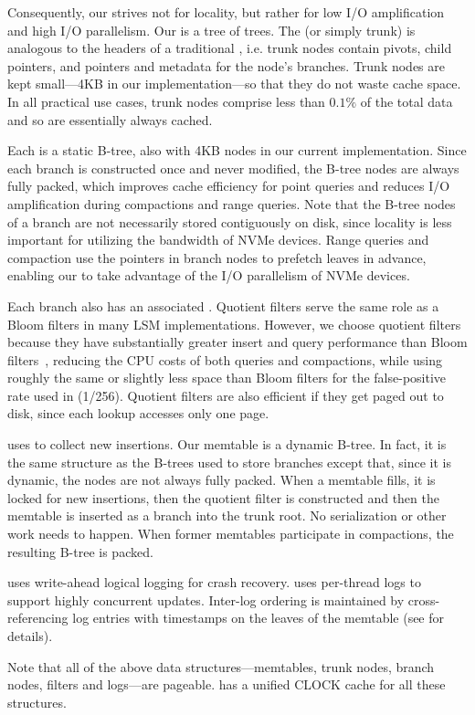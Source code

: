 Consequently, our \datastruct strives not for locality, but rather for
low I/O amplification and high I/O parallelism.  Our \datastruct is a
tree of trees. The  (or simply trunk) is analogous to
the headers of a traditional \bet, i.e. trunk nodes contain pivots,
child pointers, and pointers and metadata for the node's branches.
Trunk nodes are kept small---4KB in our implementation---so that they
do not waste cache space. In all practical use cases, trunk nodes
comprise less than $0.1\%$ of the total data and so are essentially
always cached.

Each  is a static B-tree, also with 4KB nodes in our
current implementation. Since each branch is constructed once and
never modified, the B-tree nodes are always fully packed, which
improves cache efficiency for point queries and reduces I/O
amplification during compactions and range queries.  Note that the
B-tree nodes of a branch are not necessarily stored contiguously on
disk, since locality is less important for utilizing the bandwidth of
NVMe devices. Range queries and compaction use the pointers in branch
nodes to prefetch leaves
in advance, enabling our \datastruct to take advantage of the I/O
parallelism of NVMe devices.

Each branch also has an associated . Quotient
filters serve the same role as a Bloom filters in many LSM
implementations.  However, we choose quotient filters because they
have substantially greater insert and query performance than Bloom
filters~\cite{!thrash:hash:cache:flash:pvldb}, reducing the CPU costs
of both queries and compactions, while using roughly the same or
slightly less space than Bloom filters for the false-positive rate
used in \sysname (1/256).  Quotient filters are also efficient if they
get paged out to disk, since each lookup accesses only one page.

\sysname uses  to collect new insertions.
Our memtable is a dynamic B-tree.  In fact, it is the same structure
as the B-trees used to store branches except that, since it is
dynamic, the nodes are not always fully packed.  When a memtable
fills, it is locked for new insertions, then the quotient filter is
constructed and then the memtable is inserted as a branch into the
trunk root.  No serialization or other work needs to happen.  When
former memtables participate in compactions, the resulting B-tree is
packed.

\sysname uses write-ahead logical logging for crash recovery.
\sysname uses per-thread logs to support highly concurrent updates.
Inter-log ordering is maintained by cross-referencing log entries with
timestamps on the leaves of the memtable (see  for
details).

Note that all of the above data structures---memtables, trunk nodes,
branch nodes, filters and logs---are pageable.  \sysname has a unified
CLOCK cache for all these structures.
